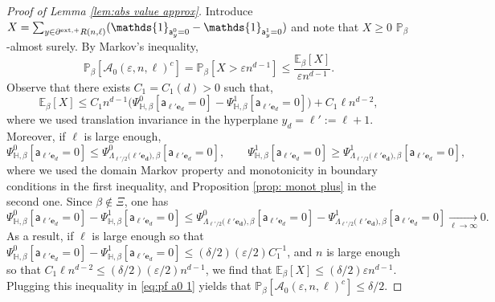 \documentclass[11pt,a4paper]{article}
\numberwithin{equation}{section}
\theoremstyle{plain}
\theoremstyle{definition}
\begin{document}
\begin{proof}[Proof of Lemma \textup{\ref{lem:abs value approx}}]
Introduce $X=\sum_{y\in \partial^{\textup{ext},+} R(n,\ell)}(\mathds{1}_{\mathsf{a}^0_y=0}-\mathds{1}_{\mathsf{a}^1_y=0})$ and note that $X\geq 0$ $\mathbb P_\beta$-almost surely. By Markov's inequality,
\begin{equation}\label{eq:pf a0 1}
    \mathbb P_\beta[\mathcal{A}_0(\varepsilon,n,\ell)^c]=\mathbb P_\beta[X>\varepsilon n^{d-1}]\leq \frac{\mathbb E_\beta[X]}{\varepsilon n^{d-1}}.
\end{equation}
Observe that there exists $C_1=C_1(d)>0$ such that,
\begin{equation}\label{eq:pf a0 2}
    \mathbb E_\beta[X]\leq C_1n^{d-1}\Big(\Psi^0_{\mathbb H,\beta}[\mathsf{a}_{\ell' \mathbf{e}_d}=0]-\Psi^1_{\mathbb H,\beta}[\mathsf{a}_{\ell' \mathbf{e}_d}=0]\Big) +C_1\ell n^{d-2},
\end{equation}
where we used translation invariance in the hyperplane $y_d=\ell':=\ell+1$.
Moreover, if $\ell$ is large enough, 
\begin{equation}\label{eq:pf a0 3}
    \Psi^0_{\mathbb H,\beta}[\mathsf{a}_{\ell' \mathbf{e}_d}=0]\leq \Psi^0_{\Lambda_{\ell'/2}(\ell' \mathbf{{e}_d)},\beta}[\mathsf{a}_{\ell' \mathbf{e}_d}=0], \qquad \Psi^1_{\mathbb H,\beta}[\mathsf{a}_{\ell' \mathbf{e}_d}=0]\geq \Psi^1_{\Lambda_{\ell'/2}(\ell' \mathbf{{e}_d)},\beta}[\mathsf{a}_{\ell' \mathbf{e}_d}=0],
\end{equation}
where we used the domain Markov property and monotonicity in boundary conditions in the first inequality, and Proposition \ref{prop: monot plus} in the second one. Since $\beta\notin \Xi$, one has
\begin{equation}\label{eq:pf a0 4}
    \Psi^0_{\mathbb H,\beta}[\mathsf{a}_{\ell' \mathbf{e}_d}=0]-\Psi^1_{\mathbb H,\beta}[\mathsf{a}_{\ell' \mathbf{e}_d}=0]\leq \Psi^0_{\Lambda_{\ell'/2}(\ell' \mathbf{{e}_d)},\beta}[\mathsf{a}_{\ell' \mathbf{e}_d}=0]-\Psi^1_{\Lambda_{\ell'/2}(\ell' \mathbf{{e}_d)},\beta}[\mathsf{a}_{\ell' \mathbf{e}_d}=0]\underset{\ell\rightarrow \infty}{\longrightarrow}0.
\end{equation}
As a result, if $\ell$ is large enough so that $\Psi^0_{\mathbb H,\beta}[\mathsf{a}_{\ell' \mathbf{e}_d}=0]-\Psi^1_{\mathbb H,\beta}[\mathsf{a}_{\ell' \mathbf{e}_d}=0]\leq (\delta/2)(\varepsilon/2)C_1^{-1}$, and $n$ is large enough so that $C_1\ell n^{d-2}\leq (\delta/2)(\varepsilon/2)n^{d-1}$, we find that $\mathbb E_{\beta}[X]\leq (\delta/2)\varepsilon n^{d-1}$. Plugging this inequality in \eqref{eq:pf a0 1} yields that $\mathbb P_\beta[\mathcal{A}_0(\varepsilon,n,\ell)^c]\leq \delta/2$.


\end{proof}
\end{document}
